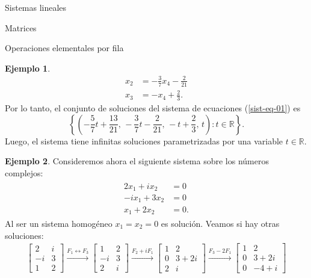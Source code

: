 \documentclass[a4paper,12pt,twoside,spanish,reqno]{amsbook}
\theoremstyle{definition}
\newtheorem{ejemplo}{Ejemplo}[section]
\theoremstyle{remark}
\newcommand{\R}{\mathbb R}
\begin{document}
\begin{chapter}{Sistemas lineales}
\begin{section}{Matrices}
\begin{subsection}{Operaciones elementales por fila}
\begin{ejemplo}
\begin{align*}
                    x_2  &=- \frac{3}{7}x_4 -\frac{2}{21} \\
                    x_3  &= -x_4+\frac{2}{3}. 
                    \end{align*}
                    Por lo tanto, el conjunto de soluciones del sistema de ecuaciones (\ref{sist-eq-01}) es
                    $$
                    \left\{(-\frac{5}{7}t+ \frac{13}{21},\,- \frac{3}{7}t-\frac{2}{21},\, -t+\frac{2}{3},\,t): t \in \R \right\}.
                    $$
                    Luego, el sistema tiene infinitas soluciones parametrizadas por una variable $t \in \R$.
                \end{ejemplo}
                
                
                \begin{ejemplo}
                    Consideremos ahora el siguiente sistema sobre los números complejos:
                    \begin{align}\label{sist-eq-03}
                    \begin{split}
                    2x_1 +i x_2 &= 0 \\
                    -ix_1 +3x_2  &=0 \\
                    x_1 +2x_2  &= 0.
                    \end{split}
                    \end{align}
                    Al ser un sistema homogéneo $x_1=x_2 = 0$ es solución. Veamos si hay otras soluciones: 
                    \begin{multline*}
                    \begin{bmatrix} 2&i \\ -i&3 \\ 1&2 \end{bmatrix}
                    \stackrel{F_1\leftrightarrow F_3}{\longrightarrow} 
                    \begin{bmatrix} 1&2 \\ -i&3 \\ 2&i \end{bmatrix}
                    \stackrel{F_2+iF_1}{\longrightarrow} 
                    \begin{bmatrix} 1&2 \\ 0&3+2i \\ 2&i \end{bmatrix}
                    \stackrel{F_3-2F_1}{\longrightarrow} 
                    \begin{bmatrix} 1&2 \\ 0&3+2i \\ 0&-4+i \end{bmatrix}

\end{multline*}
\end{ejemplo}
\end{subsection}
\end{section}
\end{chapter}
\end{document}
